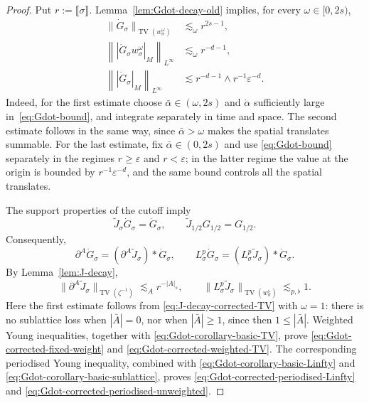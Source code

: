 \documentclass{article}
\numberwithin{equation}{section}
\newcommand{\assign}{:=}
\theoremstyle{plain}
\theoremstyle{definition}
\begin{document}
\begin{proof}
	Put \(r\assign\llbracket\sigma\rrbracket\).  Lemma~\ref{lem:Gdot-decay-old}
	implies, for every \(\omega\in[0,2s)\),
	\begin{align}
		\|\dot G_\sigma\|_{\operatorname{TV}(w_\sigma^\omega)}
		&\lesssim_\omega r^{2s-1},
		\label{eq:Gdot-corollary-basic-TV}
		\\
		\left\|\left|\dot G_\sigma w_\sigma^\omega\right|_M\right\|_{L^\infty}
		&\lesssim_\omega r^{-d-1},
		\label{eq:Gdot-corollary-basic-Linfty}
		\\
		\left\|\left|\dot G_\sigma\right|_M\right\|_{L^\infty}
		&\lesssim
		r^{-d-1}\wedge r^{-1}\varepsilon^{-d}.
		\label{eq:Gdot-corollary-basic-sublattice}
	\end{align}
	Indeed, for the first estimate choose
	\(\bar\alpha\in(\omega,2s)\) and \(\mathring\alpha\) sufficiently large
	in~\eqref{eq:Gdot-bound}, and integrate separately in time and space.
	The second estimate follows in the same way, since
	\(\bar\alpha>\omega\) makes the spatial translates summable.  For the
	last estimate, fix \(\bar\alpha\in(0,2s)\) and use
	\eqref{eq:Gdot-bound} separately in the regimes
	\(r\geq\varepsilon\) and \(r<\varepsilon\); in the latter regime the value
	at the origin is bounded by \(r^{-1}\varepsilon^{-d}\), and the same bound
	controls all the spatial translates.
	
	The support properties of the cutoff imply
	\begin{equation}
		\tilde J_\sigma\dot G_\sigma=\dot G_\sigma,
		\qquad
		\tilde J_{1/2}G_{1/2}=G_{1/2}.
		\label{eq:Gdot-corollary-cutoff}
	\end{equation}
	Consequently,
	\[
	\partial^A\dot G_\sigma
	=(\partial^A\tilde J_\sigma)*\dot G_\sigma,
	\qquad
	L_\sigma^p\dot G_\sigma
	=(L_\sigma^p\tilde J_\sigma)*\dot G_\sigma.
	\]
	By Lemma~\ref{lem:J-decay},
	\[
	\|\partial^A\tilde J_\sigma\|_{\operatorname{TV}(\zeta^{-1})}
	\lesssim_A r^{-|A|_s},
	\qquad
	\|L_\sigma^p\tilde J_\sigma\|_{\operatorname{TV}(w_\sigma^\flat)}
	\lesssim_{p,\flat}1.
	\]
	Here the first estimate follows from
	\eqref{eq:J-decay-corrected-TV} with \(\omega=1\): there is no sublattice
	loss when \(|\bar A|=0\), nor when \(|\bar A|\geq1\), since then
	\(1\leq|\bar A|\).  Weighted Young inequalities, together with
	\eqref{eq:Gdot-corollary-basic-TV}, prove
	\eqref{eq:Gdot-corrected-fixed-weight} and
	\eqref{eq:Gdot-corrected-weighted-TV}.  The corresponding periodised
	Young inequality, combined with
	\eqref{eq:Gdot-corollary-basic-Linfty} and
	\eqref{eq:Gdot-corollary-basic-sublattice}, proves
	\eqref{eq:Gdot-corrected-periodised-Linfty} and
	\eqref{eq:Gdot-corrected-periodised-unweighted}.
	

\end{proof}
\end{document}
